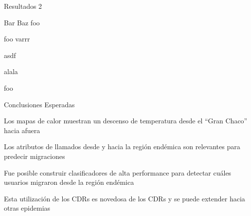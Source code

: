\documentclass[xcolor=x11names]{beamer}
\begin{document}

\begin{frame}{Resultados 2}
	\begin{block}{Bar}
		Baz
		\medskip
		foo
	\end{block}


	\begin{block}{foo}
		varrr

		\medskip
			asdf

		\medskip
		alala

		\medskip
		foo
	\end{block}
\end{frame}




\begin{frame}{Conclusiones Esperadas}

	Los mapas de calor muestran un descenso de temperatura desde el ``Gran Chaco'' hacia afuera

	\medskip
	Los atributos de llamados desde y hacia la región endémica son relevantes para predecir migraciones

	\medskip
	Fue posible construir clasificadores de alta performance para detectar cuáles usuarios migraron desde la región endémica

	\medskip

	Esta utilizaci\'on de los CDRs es novedosa de los CDRs y se puede extender hacia otras epidemias

\end{frame}

\end{document}
